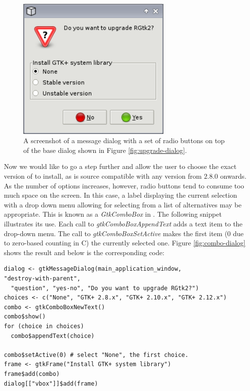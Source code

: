 \documentclass[article]{jss}
\begin{document}
\begin{figure}
\begin{center}
\includegraphics[width=3in]{radio-dialog.png}
\caption{\label{fig:radio-dialog}A screenshot of a message dialog with
a set of
radio buttons on top of the base dialog shown in Figure
\ref{fig:upgrade-dialog}.}
\end{center}
\end{figure}

Now we would like to go a step further and allow the user to choose
the exact version of  to install, as  is source
compatible with any version from $2.8.0$ onwards. As the number of
options increases, however, radio buttons tend to consume too much
space on the screen. In this case, a label displaying the current
selection with a drop down menu allowing for selecting from a list of
alternatives may be appropriate.  This is known as a
\emph{GtkComboBox} in . The following snippet illustrates
its use. Each call to \emph{gtkComboBoxAppendText} adds a text item to
the drop-down menu. The call to \emph{gtkComboBoxSetActive} makes the
first item ($0$ due to zero-based counting in C) the currently selected
one. Figure \ref{fig:combo-dialog} shows the result and below is the
corresponding code:
\begin{verbatim}
dialog <- gtkMessageDialog(main_application_window,
"destroy-with-parent", 
  "question", "yes-no", "Do you want to upgrade RGtk2?")
choices <- c("None", "GTK+ 2.8.x", "GTK+ 2.10.x", "GTK+ 2.12.x")
combo <- gtkComboBoxNewText()
combo$show()
for (choice in choices) 
  combo$appendText(choice)

combo$setActive(0) # select "None", the first choice.
frame <- gtkFrame("Install GTK+ system library")
frame$add(combo)
dialog[["vbox"]]$add(frame)
\end{verbatim}
\end{document}
